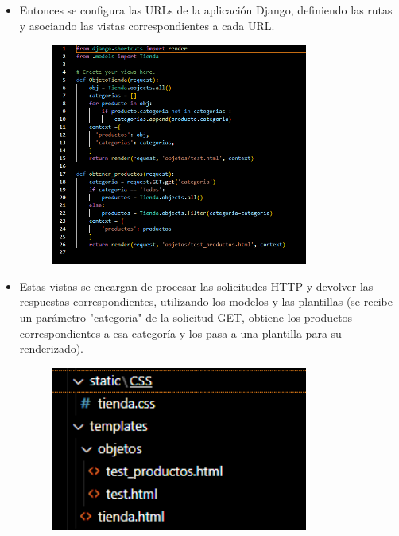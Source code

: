\documentclass{article}
\begin{document}
  \begin{itemize}
		\item Entonces se configura las URLs de la aplicación Django, definiendo las rutas y asociando las vistas correspondientes a cada URL. 
	\begin{figure}[H]
		\centering
		\includegraphics[width=0.8\textwidth,keepaspectratio]{Latex/img/views.png}
	\end{figure}
	\end{itemize}
 \begin{itemize}
		\item  Estas vistas se encargan de procesar las solicitudes HTTP y devolver las respuestas correspondientes, utilizando los modelos y las plantillas (se recibe un parámetro "categoria" de la solicitud GET, obtiene los productos correspondientes a esa categoría y los pasa a una plantilla para su renderizado). 
	\begin{figure}[H]
		\centering
		\includegraphics[width=0.8\textwidth,keepaspectratio]{Latex/img/css-templates.png}
	\end{figure}
	\end{itemize}
\end{document}

